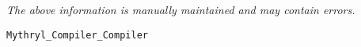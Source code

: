\label{pkg:mythryl\_compiler\_compiler\_for\_this\_platform}

{\tiny \it The above information is manually maintained and may contain errors.}
\begin{verbatim}
Mythryl_Compiler_Compiler
\end{verbatim}
